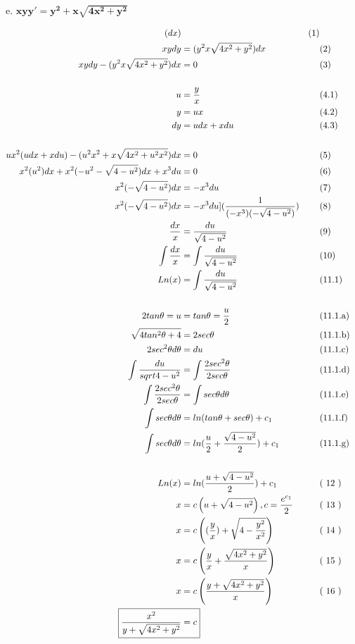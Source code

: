 \documentclass{article}
\newcommand{\newLine}[3]{ #1 & = #2 && \text{(#3)}\\ }
\newcommand{\finalAnswer}[2]{ \Aboxed{ #1 & = #2 } }
\newcommand{\p}[1]{ \left( #1 \right) }
\begin{document}
\begin{flushleft}
        \hspace{10mm} e. $
            \boldsymbol{ xyy' = y^2 + x\sqrt{4x^2 + y^2} }
            $  \break

            \begin{align*}
                \newLine{[ xy\frac{dy}{dx}} {y^2 x\sqrt{ 4x^2 + y^2} ] (dx) } {1}
                \newLine{xydy} {(y^2 x\sqrt{ 4x^2 + y^2})dx} {2}
                \newLine{xydy - (y^2 x\sqrt{ 4x^2 + y^2})dx } {0} {3}
                \\
                \newLine{u}{\frac{y}{x}}{4.1}
                \newLine{y}{ux}{4.2}
                \newLine{dy}{udx+xdu}{4.3}
                \\
                \newLine{ux^2 (udx + xdu) - (u^2 x^2 + x \sqrt{4x^2 + u^2 x^2})dx}{0}{5}
                \newLine{ x^2(u^2)dx + x^2(-u^2 - \sqrt{4-u^2})dx + x^3du }{0}{6}
                \newLine{ x^2(-\sqrt{4-u^2})dx }{-x^3du}{7}
                \newLine{ x^2(-\sqrt{4-u^2})dx }{-x^3du ] (\frac{1}{(-x^3)(-\sqrt{4-u^2})})}{8}
                \newLine{ \frac{dx}{x} }{ \frac{du}{ \sqrt{4-u^2}} }{9}
                \newLine{\int \frac{dx}{x} }{ \int \frac{du}{ \sqrt{4-u^2}} }{10}
                \newLine{ Ln(x) }{ \int \frac{du}{ \sqrt{4-u^2}} }{11.1}
                \\
                \newLine{2tan\theta = u}{ tan\theta = \frac{u}{2} }{11.1.a}
                \newLine{\sqrt{ 4tan^{2}\theta +4 }}{2sec\theta}{11.1.b}
                \newLine{2sec^{2}\theta d\theta}{du}{11.1.c}
                \newLine{ \int \frac{du}{sqrt{4-u^2}} } { \int \frac{ 2sec^{2}\theta }{ 2sec\theta } } {11.1.d}
                \newLine{ \int \frac{ 2sec^{2}\theta }{ 2sec\theta } } { \int sec\theta d\theta } {11.1.e}
                \newLine{ \int sec\theta d\theta } { ln(tan\theta + sec\theta) + c_1 } {11.1.f}
                \newLine{ \int sec\theta d\theta } { ln( \frac{u}{2} + \frac{ \sqrt{4-u^2} }{2} ) + c_1 } {11.1.g}
                \\
                \newLine{ Ln(x) } { ln( \frac{u + \sqrt{4-u^2} }{2} ) + c_1 } { 12 }
                \newLine{ x } { c \left( u + \sqrt{4-u^2}  \right), c=\frac{e^{c_1}}{2} } { 13 }
                \newLine{ x } { c \left( (\frac{y}{x}) + \sqrt{4-\frac{y^2}{x^2}} \right)  } { 14 }
                \newLine{ x } { c \p{ \frac{y}{x} + \frac{ \sqrt{4x^2 + y^2} }{x} } } { 15 }
                \newLine{ x } { c \p{ \frac{y + \sqrt{4x^2 + y^2} }{x} } } { 16 }
                \finalAnswer{ \frac{ x^2 }{ y + \sqrt{4x^2 + y^2} } }{c}
            \end{align*}
            
    \end{flushleft}
\end{document}
